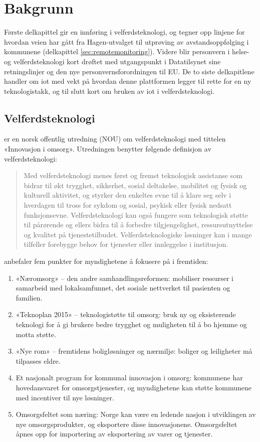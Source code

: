 \chapter{Bakgrunn}
\label{ch:background}
Første delkapittel gir en innføring i velferdsteknologi, og tegner opp linjene for hvordan veien har gått
fra Hagen-utvalget til utprøving av avstandsoppfølging i kommunene (delkapittel \ref{sec:remotemonitoring}).
Videre blir personvern i helse- og velferdsteknologi kort drøftet med utgangspunkt i Datatilsynet sine retningslinjer
og den nye personvernsforordningen til EU. De to siste delkapitlene handler om \gls{iot} med vekt på hvordan
denne plattformen legger til rette for en ny teknologistakk, og til slutt kort om bruken av \gls{iot} i velferdsteknologi.

\section{Velferdsteknologi}
\citet{regjeringen_hagen} er en norsk offentlig utredning (NOU) om velferdsteknologi med tittelen «Innovasjon i omsorg».
Utredningen benytter følgende definisjon av velferdsteknologi:

\blockquote{
Med velferdsteknologi menes først og fremst
teknologisk assistanse som bidrar til økt trygghet,
sikkerhet, sosial deltakelse, mobilitet og
fysisk og kulturell aktivitet, og styrker den
enkeltes evne til å klare seg selv i hverdagen til
tross for sykdom og sosial, psykisk eller fysisk
nedsatt funksjonsevne. Velferdsteknologi kan
også fungere som teknologisk støtte til pårørende og
ellers bidra til å forbedre tilgjengelighet,
ressursutnyttelse og kvalitet på tjenestetilbudet.
Velferdsteknologiske løsninger kan i
mange tilfeller forebygge behov for tjenester
eller innleggelse i institusjon.
}

\citet{regjeringen_hagen} anbefaler fem punkter for myndighetene å fokusere på i fremtiden:

\begin{enumerate}
    \item «Næromsorg» -- den andre samhandlingsreformen: mobiliser ressurser i samarbeid med
    lokalsamfunnet, det sosiale nettverket til pasienten og familien.
    \item «Teknoplan 2015» -- teknologistøtte til omsorg: bruk ny og eksisterende teknologi for å gi brukere
    bedre trygghet og muligheten til å bo hjemme og motta støtte.
    \item «Nye rom» -- fremtidens boligløsninger og nærmiljø: boliger og leiligheter må tilpasses eldre.
    \item Et nasjonalt program for kommunal innovasjon i omsorg: kommunene har hovedansvaret for omsorgstjenester,
    og myndighetene kan støtte kommunene med incentiver til nye løsninger.
    \item Omsorgsfeltet som næring: Norge kan være en ledende nasjon i utviklingen av nye omsorgsprodukter, og
    eksportere disse innovasjonene. Omsorgsfeltet åpnes opp for importering av eksportering av varer og tjenester.
\end{enumerate}

